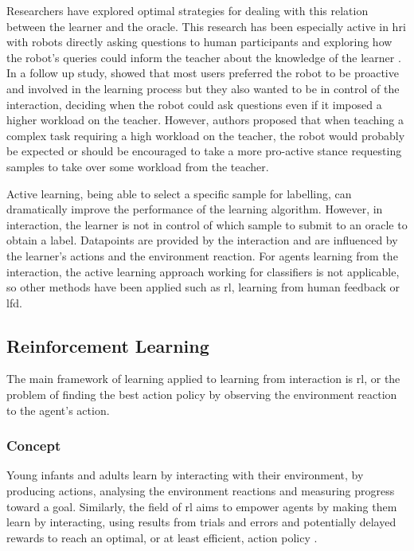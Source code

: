 Researchers have explored optimal strategies for dealing with this relation between the learner and the oracle. This research has been especially active in \gls{hri} with robots directly asking questions to human participants and exploring how the robot's queries could inform the teacher about the knowledge of the learner \citep{chao2010transparent}. In a follow up study, \cite{cakmak2010designing} showed that most users preferred the robot to be proactive and involved in the learning process but they also wanted to be in control of the interaction, deciding when the robot could ask questions even if it imposed a higher workload on the teacher. However, authors proposed that when teaching a complex task requiring a high workload on the teacher, the robot would probably be expected or should be encouraged to take a more pro-active stance requesting samples to take over some workload from the teacher.

Active learning, being able to select a specific sample for labelling, can dramatically improve the performance of the learning algorithm. However, in interaction, the learner is not in control of which sample to submit to an oracle to obtain a label. Datapoints are provided by the interaction and are influenced by the learner's actions and the environment reaction. For agents learning from the interaction, the active learning approach working for classifiers is not applicable, so other methods have been applied such as \gls{rl}, learning from human feedback or \gls{lfd}.

\subsection{Reinforcement Learning}

The main framework of learning applied to learning from interaction is \gls{rl}, or the problem of finding the best action policy by observing the environment reaction to the agent's action.

\subsubsection{Concept} 
	Young infants and adults learn by interacting with their environment, by producing actions, analysing the environment reactions and measuring progress toward a goal. Similarly, the field of \acrfull{rl} aims to empower agents by making them learn by interacting, using results from trials and errors and potentially delayed rewards to reach an optimal, or at least efficient, action policy \citep{sutton1998reinforcement}. 

